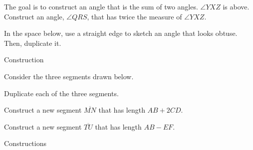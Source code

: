 	
\smallskip	

\noindent \q The goal is to construct an angle that is the sum of two angles.  $\angle YXZ$ is above. Construct an angle, $\angle QRS$, that has twice the measure of $\angle YXZ$.

\bigskip

\begin{exercises}

\begin{ex}
In the space below, use a straight edge to sketch an angle that looks obtuse. Then, duplicate it.
\bigskip
\begin{sol}
Construction
\end{sol}
\end{ex}

\begin{ex}

Consider the three segments drawn below.


\begin{exparts}
\item Duplicate each of the three segments.
\bigskip
\item Construct a new segment $\overline{MN}$ that has length $AB+2CD$.
\vspace{1.5cm}
\item Construct a new segment $\overline{TU}$ that has length $AB - EF$.
\vspace{1.5cm}
\end{exparts}
\begin{sol}
Constructions
\end{sol}
\end{ex}


\end{exercises}

